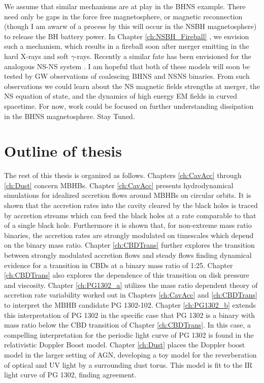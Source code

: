 We assume that similar mechanisms are at play in the BHNS example. There need
only be gaps in the force free magnetosphere, or magnetic reconnection (though
I am awarw of a process by this will occur in the NSBH magnetosphere) to
release the BH battery power. In Chapter \ref{ch:NSBH_Fireball}
\citep{DL:2016}, we envision such a mechanism, which results in a fireball
soon after merger emitting in the hard X-rays and soft $\gamma$-rays. Recently
a similar fate has been envisioned for the analogous NS-NS system
\citep{MetzgerNSNS:2016}. I am hopeful that both of these models will soon be
tested by GW observations of coalescing BHNS and NSNS binaries. From such
observations we could learn about the NS magnetic fields strengths at merger,
the NS equation of state, and the dynamics of high energy EM fields in curved
spacetime. For now, work could be focused on further understanding dissipation
in the BHNS magnetosphere. Stay Tuned.











\section{Outline of thesis}   

The rest of this thesis is organized as follows. Chapters \ref{ch:CavAcc}
through \ref{ch:Dust} concern MBHBs. Chapter \ref{ch:CavAcc} presents
hydrodynamical simulations for idealized accretion flows around MBHBs on
circular orbits. It is shown that the accretion rates into the cavity cleared
by the black holes is traced by accretion streams which can feed the black
holes at a rate comparable to that of a single black hole. Furthermore it is
shown that, for non-extreme mass ratio binaries, the accretion rates are
strongly modulated on timescales which depend on the binary mass ratio.
Chapter \ref{ch:CBDTrans} further explores the transition between strongly
modulated accretion flows and steady flows finding dynamical evidence for a
transition in CBDs at a binary mass ratio of 1:25. Chapter \ref{ch:CBDTrans}
also explores the dependence of this transition on disk pressure and
viscosity. Chapter \ref{ch:PG1302_a} utilizes the mass ratio dependent theory
of accretion rate variability worked out in Chapters \ref{ch:CavAcc} and
\ref{ch:CBDTrans} to interpret the MBHB candidate PG 1302-102. Chapter
\ref{ch:PG1302_b} extends this interpretation of PG 1302 in the specific case
that PG 1302 is a binary with mass ratio below the CBD transition of Chapter
\ref{ch:CBDTrans}. In this case, a compelling interpretation for the periodic
light curve of PG 1302 is found in the relativistic Doppler Boost model.
Chapter \ref{ch:Dust} places the Doppler boost model in the larger setting of
AGN, developing a toy model for the reverberation of optical and UV light by a
surrounding dust torus. This model is fit to the IR light curve of PG 1302,
finding agreement.

